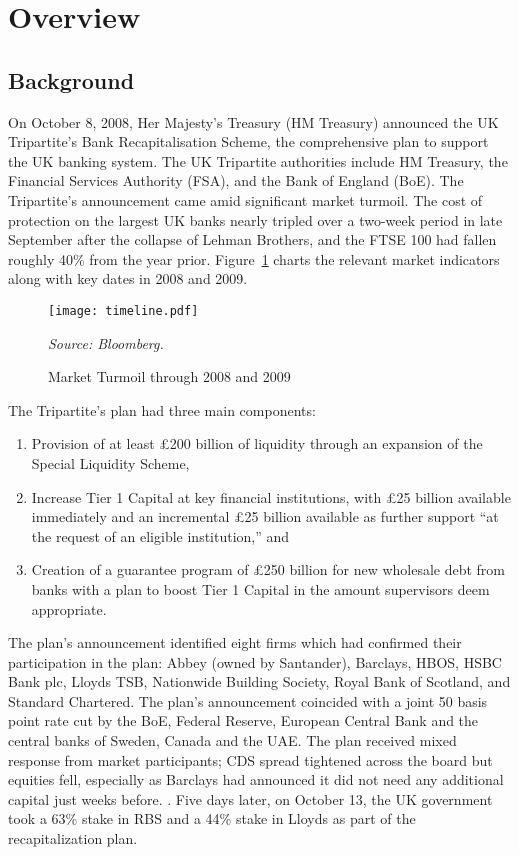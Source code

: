 \documentclass[12pt]{article}
\begin{document}
\section{Overview}

\subsection{Background}

On October 8, 2008, Her Majesty's Treasury (HM Treasury) announced the UK Tripartite's Bank Recapitalisation Scheme, the comprehensive plan to support the UK banking system. The UK Tripartite authorities include HM Treasury, the Financial Services Authority (FSA), and the Bank of England (BoE). The Tripartite's announcement came amid significant market turmoil. The cost of protection on the largest UK banks nearly tripled over a two-week period in late September after the collapse of Lehman Brothers, and the FTSE 100 had fallen roughly 40\% from the year prior. Figure~\ref{timeline} charts the relevant market indicators along with key dates in 2008 and 2009.

\begin{figure}[h]
\caption{Market Turmoil through 2008 and 2009}\label{timeline}
\centering
\texttt{[image: timeline.pdf]}
\raggedright
\textit{\footnotesize Source: Bloomberg.}
\end{figure}

The Tripartite's plan had three main components:

\begin{enumerate}
\item Provision of at least \pounds 200 billion of liquidity through an expansion of the Special Liquidity Scheme,
\item Increase Tier 1 Capital at key financial institutions, with \pounds 25 billion available immediately and an incremental \pounds 25 billion available as further support ``at the request of an eligible institution,'' and
\item Creation of a guarantee program of \pounds 250 billion for new wholesale debt from banks with a plan to boost Tier 1 Capital in the amount supervisors deem appropriate.
\end{enumerate}

The plan's announcement identified eight firms which had confirmed their participation in the plan: Abbey (owned by Santander), Barclays, HBOS, HSBC Bank plc, Lloyds TSB, Nationwide Building Society, Royal Bank of Scotland, and Standard Chartered. The plan's announcement coincided with a joint 50 basis point rate cut by the BoE, Federal Reserve, European Central Bank and the central banks of Sweden, Canada and the UAE. The plan received mixed response from market participants; CDS spread tightened across the board but equities fell, especially as Barclays had announced it did not need any additional capital just weeks before. \citep{BRSAnnouncement}. Five days later, on October 13, the UK government took a 63\% stake in RBS and a 44\% stake in Lloyds as part of the recapitalization plan.
\end{document}
